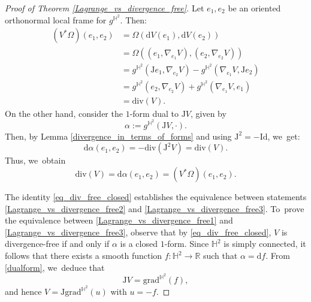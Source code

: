 \begin{proof}[Proof of Theorem \ref{Lagrange_vs_divergence_free}]
Let \(e_1, e_2 \) be an oriented orthonormal local frame for \(g^{\mathbb{H}^2} \). Then:
\begin{align*}
(V^*\Omega)(e_1, e_2)
&= \Omega(\mathrm{d}V(e_1), \mathrm{d}V(e_2)) \\
&= \Omega((e_1, \nabla_{e_1}V), (e_2, \nabla_{e_2}V)) \\
&= g^{\mathbb{H}^2}(\mathrm{J}e_1, \nabla_{e_2}V) - g^{\mathbb{H}^{2}}(\nabla_{e_1}V, \mathrm{J}e_2) \\
&= g^{\mathbb{H}^2}(e_2, \nabla_{e_2}V) + g^{\mathbb{H}^{2}}(\nabla_{e_1}V, e_1) \\
&= \mathrm{div}(V).
\end{align*}
On the other hand, consider the $1$-form dual to \(\mathrm{J}V \), given by
\begin{equation}\label{dualform}
\alpha := g^{\mathbb{H}^2}(\mathrm{J}V, \cdot).
\end{equation}
Then, by Lemma \ref{divergence_in_terms_of_forms} and using \(\mathrm{J}^2 = -\mathrm{Id} \), we~get:
\[
\mathrm{d}\alpha(e_1, e_2) = -\mathrm{div}(\mathrm{J}^2 V) = \mathrm{div}(V).
\]
Thus, we~obtain
\begin{equation}\label{eq_div_free_closed}
\mathrm{div}(V) = \mathrm{d}\alpha(e_1, e_2) = (V^*\Omega)(e_1, e_2).
\end{equation}

The identity \eqref{eq_div_free_closed} establishes the equivalence between statements \eqref{Lagrange_vs_divergence_free2} and \eqref{Lagrange_vs_divergence_free3}. To~prove the equivalence between \eqref{Lagrange_vs_divergence_free1} and \eqref{Lagrange_vs_divergence_free3}, observe that by \eqref{eq_div_free_closed}, \(V \) is divergence-free if and only if \(\alpha \) is a closed $1$-form. Since \(\mathbb{H}^2 \) is simply connected, it follows that there exists a smooth function \(f: \mathbb{H}^2 \to \mathbb{R} \) such that \(\alpha = \mathrm{d}f \). From \eqref{dualform}, we~deduce that
\[
\mathrm{J}V = \mathrm{grad}^{\mathbb{H}^2}(f),
\]
and hence \(V = \mathrm{J} \mathrm{grad}^{\mathbb{H}^2} (u) \) with \(u = -f \).
\end{proof}

